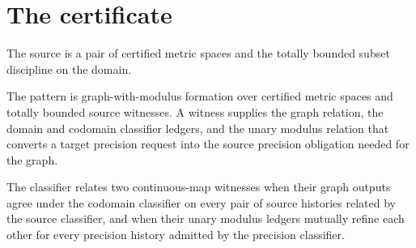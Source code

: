\section{The certificate}

\begin{definition}
\label{def:continuous-source-specification}
The source is a pair of certified metric spaces and the totally bounded subset discipline on the domain.
\end{definition}

\begin{definition}
\label{def:continuous-pattern-specification}
The pattern is graph-with-modulus formation over certified metric spaces and totally bounded source witnesses. A witness supplies the graph relation, the domain and codomain classifier ledgers, and the unary modulus relation that converts a target precision request into the source precision obligation needed for the graph.
\end{definition}

\begin{definition}
\label{def:continuous-classifier-specification}
The classifier relates two continuous-map witnesses when their graph outputs agree under the codomain classifier on every pair of source histories related by the source classifier, and when their unary modulus ledgers mutually refine each other for every precision history admitted by the precision classifier.
\end{definition}



